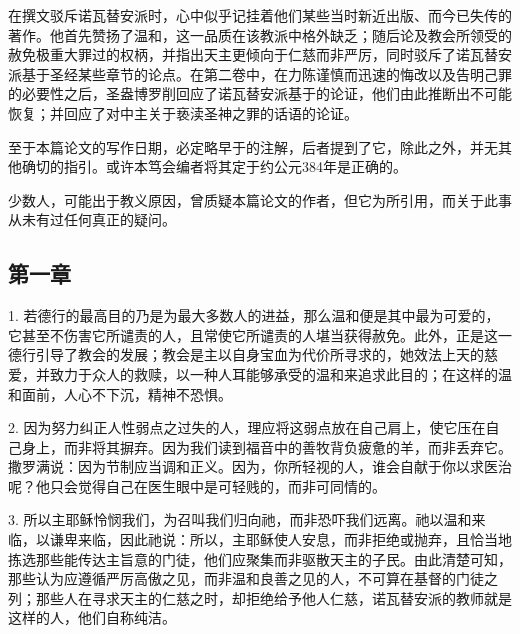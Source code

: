 在撰文驳斥诺瓦替安派时，心中似乎记挂着他们某些当时新近出版、而今已失传的著作。他首先赞扬了温和，这一品质在该教派中格外缺乏；随后论及教会所领受的赦免极重大罪过的权柄，并指出天主更倾向于仁慈而非严厉，同时驳斥了诺瓦替安派基于圣经某些章节的论点。在第二卷中，在力陈谨慎而迅速的悔改以及告明己罪的必要性之后，圣盎博罗削回应了诺瓦替安派基于的论证，他们由此推断出不可能恢复；并回应了对中主关于亵渎圣神之罪的话语的论证。\par

至于本篇论文的写作日期，必定略早于的注解，后者提到了它，除此之外，并无其他确切的指引。或许本笃会编者将其定于约公元384年是正确的。\par

少数人，可能出于教义原因，曾质疑本篇论文的作者，但它为所引用，而关于此事从未有过任何真正的疑问。\par


\subsection{第一章}

\par

1. 若德行的最高目的乃是为最大多数人的进益，那么温和便是其中最为可爱的，它甚至不伤害它所谴责的人，且常使它所谴责的人堪当获得赦免。此外，正是这一德行引导了教会的发展；教会是主以自身宝血为代价所寻求的，她效法上天的慈爱，并致力于众人的救赎，以一种人耳能够承受的温和来追求此目的；在这样的温和面前，人心不下沉，精神不恐惧。\par

2. 因为努力纠正人性弱点之过失的人，理应将这弱点放在自己肩上，使它压在自己身上，而非将其摒弃。因为我们读到福音中的善牧背负疲惫的羊，而非丢弃它。撒罗满说：因为节制应当调和正义。因为，你所轻视的人，谁会自献于你以求医治呢？他只会觉得自己在医生眼中是可轻贱的，而非可同情的。\par

3. 所以主耶稣怜悯我们，为召叫我们归向祂，而非恐吓我们远离。祂以温和来临，以谦卑来临，因此祂说：所以，主耶稣使人安息，而非拒绝或抛弃，且恰当地拣选那些能传达主旨意的门徒，他们应聚集而非驱散天主的子民。由此清楚可知，那些认为应遵循严厉高傲之见，而非温和良善之见的人，不可算在基督的门徒之列；那些人在寻求天主的仁慈之时，却拒绝给予他人仁慈，诺瓦替安派的教师就是这样的人，他们自称纯洁。\par

